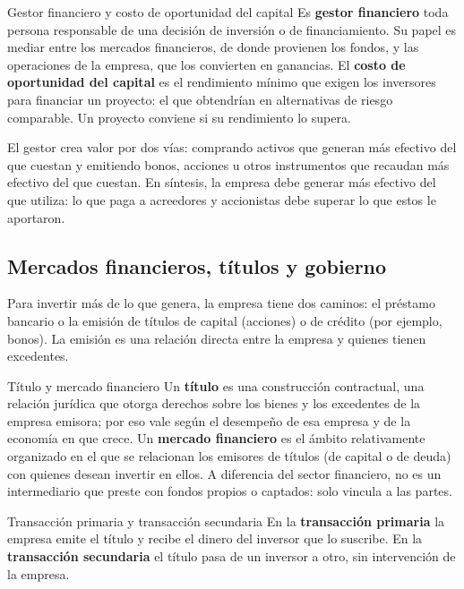 \begin{definicion}{Gestor financiero y costo de oportunidad del capital}
Es \textbf{gestor financiero} toda persona responsable de una decisión de inversión o de financiamiento. Su papel es mediar entre los mercados financieros, de donde provienen los fondos, y las operaciones de la empresa, que los convierten en ganancias. El \textbf{costo de oportunidad del capital} es el rendimiento mínimo que exigen los inversores para financiar un proyecto: el que obtendrían en alternativas de riesgo comparable. Un proyecto conviene si su rendimiento lo supera.
\end{definicion}

El gestor crea valor por dos vías: comprando activos que generan más efectivo del que cuestan y emitiendo bonos, acciones u otros instrumentos que recaudan más efectivo del que cuestan. En síntesis, la empresa debe generar más efectivo del que utiliza: lo que paga a acreedores y accionistas debe superar lo que estos le aportaron.

\subsection{Mercados financieros, títulos y gobierno}

Para invertir más de lo que genera, la empresa tiene dos caminos: el préstamo bancario o la emisión de títulos de capital (acciones) o de crédito (por ejemplo, bonos). La emisión es una relación directa entre la empresa y quienes tienen excedentes.

\begin{definicion}{Título y mercado financiero}
Un \textbf{título} es una construcción contractual, una relación jurídica que otorga derechos sobre los bienes y los excedentes de la empresa emisora; por eso vale según el desempeño de esa empresa y de la economía en que crece. Un \textbf{mercado financiero} es el ámbito relativamente organizado en el que se relacionan los emisores de títulos (de capital o de deuda) con quienes desean invertir en ellos. A diferencia del sector financiero, no es un intermediario que preste con fondos propios o captados: solo vincula a las partes.
\end{definicion}

\begin{definicion}{Transacción primaria y transacción secundaria}
En la \textbf{transacción primaria} la empresa emite el título y recibe el dinero del inversor que lo suscribe. En la \textbf{transacción secundaria} el título pasa de un inversor a otro, sin intervención de la empresa.
\end{definicion}

